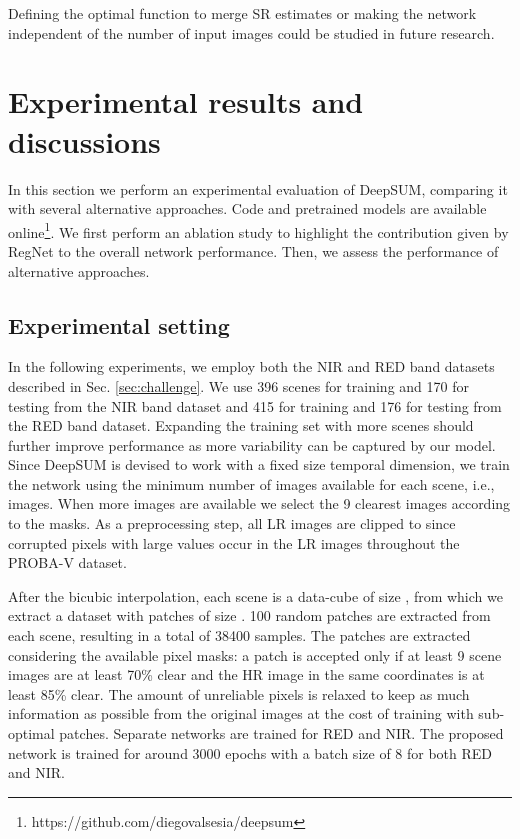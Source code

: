 \documentclass[journal]{IEEEtran}
\begin{document}
Defining the optimal function to merge SR estimates or making the network independent of the number of input images could be studied in future research.

\section{Experimental results and discussions}
\label{sec:results}
In this section we perform an experimental evaluation of DeepSUM, comparing it with several alternative approaches. Code and pretrained models are available online\footnote{https://github.com/diegovalsesia/deepsum}.
We first perform an ablation study to highlight the contribution given by RegNet to the overall network performance.
Then, we assess the performance of alternative approaches.


\subsection{Experimental setting}
In the following experiments, we employ both the NIR and RED band datasets described in Sec. \ref{sec:challenge}. We use 396 scenes for training and 170 for testing from the NIR band dataset and 415 for training and 176 for testing from the RED band dataset. Expanding the training set with more scenes should further improve performance as more variability can be captured by our model. Since DeepSUM is devised to work with a fixed size temporal dimension, we train the network using the minimum number of images available for each scene, i.e.,  images. When more images are available we select the 9 clearest images according to the masks.  As a preprocessing step, all LR images are clipped to  since corrupted pixels with large values occur in the LR images throughout the PROBA-V dataset. 

After the bicubic interpolation, each scene is a data-cube of size , from which we extract a dataset with patches of size . 100 random patches are extracted from each scene, resulting in a total of 38400 samples. The patches are extracted considering the available pixel masks: a patch is accepted only if at least 9 scene images are at least 70\% clear and the HR image in the same coordinates is at least 85\% clear. The amount of unreliable pixels is relaxed to keep as much information as possible from the original images at the cost of training with sub-optimal patches. Separate networks are trained for RED and NIR. The proposed network is trained for around 3000 epochs with a batch size of 8 for both RED and NIR.
\end{document}
